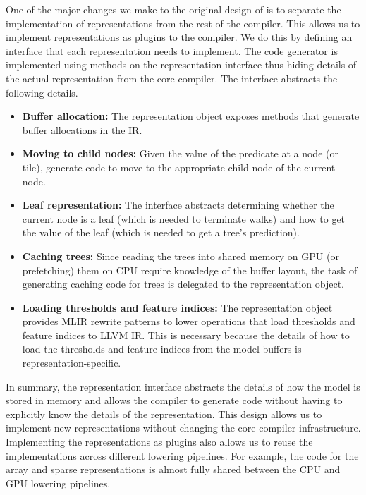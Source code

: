 One of the major changes we make to the original design of \Treebeard{} \cite{Treebeard} is to
separate the implementation of representations from the rest of the compiler. This allows
us to implement representations as plugins to the compiler. We do this by defining an interface 
that each representation needs to implement. The code generator is implemented using methods 
on the representation interface thus hiding details of the actual representation from the core 
compiler. The interface abstracts the following details. 
\begin{itemize}
  \item \textbf{Buffer allocation:} The representation object exposes methods that generate 
  buffer allocations in the IR. 
  \item \textbf{Moving to child nodes:} Given the value of the predicate at a node (or tile),
  generate code to move to the appropriate child node of the current node.
  \item \textbf{Leaf representation:} The interface abstracts determining whether the current
  node is a leaf (which is needed to terminate walks) and how to get the value of the leaf
  (which is needed to get a tree's prediction).
  \item \textbf{Caching trees:} Since reading the trees into shared memory on GPU (or prefetching)
  them on CPU require knowledge of the buffer layout, the task of generating caching code for trees
  is delegated to the representation object. 
  \item \textbf{Loading thresholds and feature indices:} The representation object provides MLIR 
  rewrite patterns to lower operations that load thresholds and feature indices to LLVM IR. This
  is necessary because the details of how to load the thresholds and feature indices from the model 
  buffers is representation-specific.
\end{itemize}

In summary, the representation interface abstracts the details of how the model is stored in memory
and allows the compiler to generate code without having to explicitly know the details of the
representation. This design allows us to implement new representations without changing the core
compiler infrastructure. Implementing the representations as plugins also allows us to reuse
the implementations across different lowering pipelines. For example, the code for the array 
and sparse representations is almost fully shared between the CPU and GPU lowering pipelines.   

